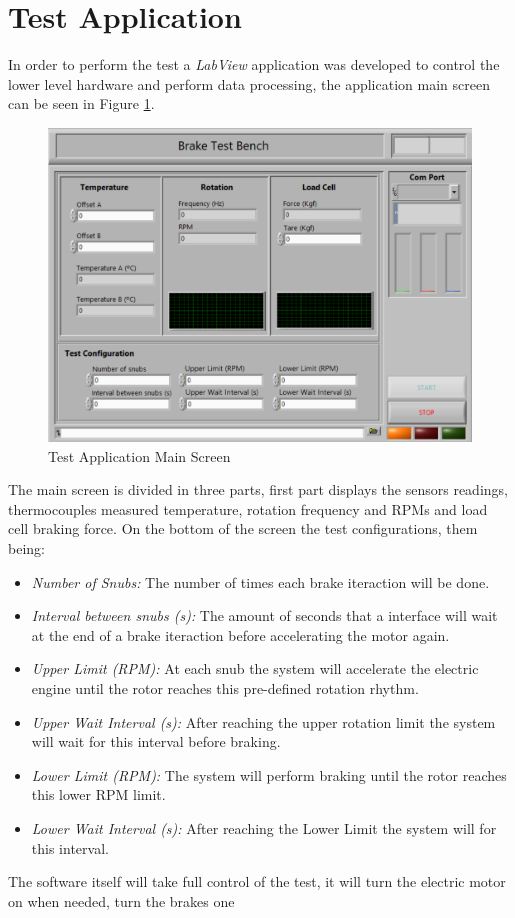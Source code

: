 \section{Test Application}\label{ssec:testApplication}
	In order to perform the test a \textit{LabView} application was developed to control the lower level hardware and perform data processing, the application main screen can be seen in Figure \ref{fig:labview-app-mainscreen}.

	\begin{figure}[htbp]
		\centering
		\includegraphics[width=1\textwidth]{figuras/fig-labview-app-mainscreen}
		\caption{Test Application Main Screen}
		\label{fig:labview-app-mainscreen}
	\end{figure}

	The main screen is divided in three parts, first part displays the sensors readings, thermocouples measured temperature, rotation frequency and RPMs and load cell braking force. On the bottom of the screen the test configurations, them being:

	\begin{itemize}
		\item\textit{Number of Snubs:} The number of times each brake iteraction will be done.
		\item\textit{Interval between snubs (s):} The amount of seconds that a interface will wait at the end of a brake iteraction before accelerating the motor again.
		\item\textit{Upper Limit (RPM):} At each snub the system will accelerate the electric engine until the rotor reaches this pre-defined rotation rhythm.
		\item\textit{Upper Wait Interval (s):} After reaching the upper rotation limit the system will wait for this interval before braking.
		\item\textit{Lower Limit (RPM):} The system will perform braking until the rotor reaches this lower RPM limit.
		\item\textit{Lower Wait Interval (s):} After reaching the Lower Limit the system will for this interval.
	\end{itemize}

	The software itself will take full control of the test, it will turn the electric motor on when needed, turn the brakes one